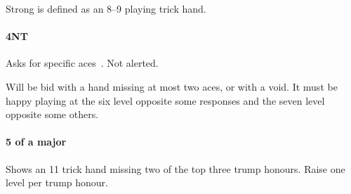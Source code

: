 Strong is defined as an 8--9 playing trick hand.

\paragraph{4NT}

Asks for specific aces~. Not alerted.

Will be bid with a hand missing at most two aces, or with a void. It must be happy playing at the six level opposite some responses and the seven level opposite some others.

\paragraph{5 of a major}

Shows an 11 trick hand missing two of the top three trump honours. Raise one level per trump honour.


